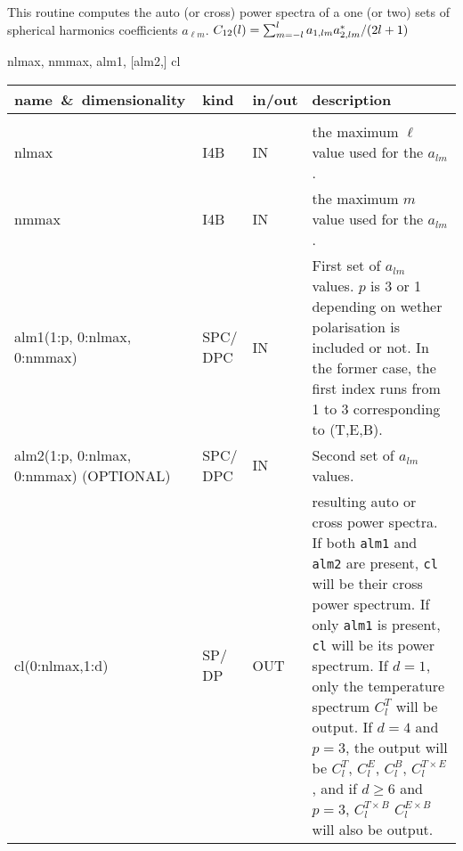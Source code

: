 
\sloppy


\section[alm2cl*]{ }
\label{sub:alm2cl}
\author{Eric Hivon}

\begin{facility}
{This routine computes the auto (or cross) power spectra of a one (or two) sets of spherical harmonics
  coefficients $a_{\ell m}$.
$C_{12}(l) = \sum_{m=-l}^{l} a_{1,l m}
  a_{2,l m}^* / (2 l +1) $ }
{\modAlmTools}
\end{facility}

\begin{f90format}
{nlmax, nmmax, alm1, [alm2,] cl}
\end{f90format}

\begin{arguments}
{
\begin{tabular}{p{0.35\hsize} p{0.05\hsize} p{0.1\hsize} p{0.40\hsize}} \hline  
\textbf{name~\&~dimensionality} & \textbf{kind} & \textbf{in/out} & \textbf{description} \\ \hline
                   &   &   &                           \\ %
nlmax & I4B & IN & the maximum $\ell$ value used for the $a_{lm}$. \\
nmmax & I4B & IN & the maximum $m$ value used for the $a_{lm}$. \\
alm1(1:p, 0:nlmax, 0:nmmax) & SPC/ DPC & IN & First set of $a_{lm}$ values. $p$
                   is 3 or 1 depending on wether polarisation is included or
                   not. In the former case, the first index runs from 1 to 3 corresponding to (T,E,B). \\
alm2(1:p, 0:nlmax, 0:nmmax) \hskip 3cm (OPTIONAL) & SPC/ DPC & IN & Second set of $a_{lm}$
                   values.  \\
cl(0:nlmax,1:d) & SP/ DP & OUT & resulting auto or cross power spectra. 
                   If both {\tt alm1} and {\tt alm2} are present, {\tt cl} will
                   be their cross power spectrum. If only {\tt alm1} is present,
                   {\tt cl} will be its power spectrum. 
		   If $d=1$, only the temperature spectrum
                   $C_l^T$ will
                   be output. If $d=4$ and $p=3$, the output will be $C_l^T$, $C_l^E$,
                   $C_l^B$, $C_l^{T\times E}$, and if $d\geq 6$ and $p=3$, $C_l^{T\times
                   B}$  $C_l^{E\times B}$ will also be output.
\end{tabular}
}
\end{arguments}

